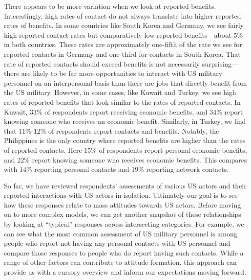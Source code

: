 There appears to be more variation when we look at reported benefits. Interestingly, high rates of contact do not always translate into higher reported rates of benefits. In some countries like South Korea and Germany, we see fairly high reported contact rates but comparatively low reported benefits---about 5\% in both countries. These rates are approximately one-fifth of the rate we see for reported contacts in Germany and one-third for contacts in South Korea. That rate of reported contacts should exceed benefits is not necessarily surprising---there are likely to be far more opportunities to interact with US military personnel on an interpersonal basis than there are jobs that directly benefit from the US military. However, in some cases, like Kuwait and Turkey, we see high rates of reported benefits that look similar to the rates of reported contacts. In Kuwait, 33\% of respondents report receiving economic benefits, and 34\% report knowing someone who receives an economic benefit.
Similarly, in Turkey, we find that 11\%-12\% of respondents report contacts and benefits. Notably, the Philippines is the only country where reported benefits are higher than the rates of reported contacts. Here 15\% of respondents report personal economic benefits, and 22\% report knowing someone who receives economic benefits. This compares with 14\% reporting personal contacts and 19\% reporting network contacts. 


So far, we have reviewed respondents' assessments of various US actors and their reported interactions with US actors in isolation. Ultimately our goal is to see how these responses relate to mass attitudes towards US actors. Before moving on to more complex models, we can get another snapshot of these relationships by looking at ``typical'' responses across intersecting categories. For example, we can see what the most common assessment of US military personnel is among people who report not having any personal contacts with US personnel and compare those responses to people who do report having such contacts. While a range of other factors can contribute to attitude formation, this approach can provide us with a cursory overview and inform our expectations moving forward.



